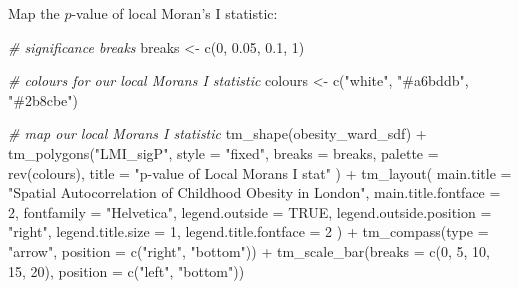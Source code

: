 \documentclass[
]{book}
\newenvironment{Shaded}{\begin{snugshade}}{\end{snugshade}}
\newcommand{\AttributeTok}[1]{\textcolor[rgb]{0.77,0.63,0.00}{#1}}
\newcommand{\CommentTok}[1]{\textcolor[rgb]{0.56,0.35,0.01}{\textit{#1}}}
\newcommand{\ConstantTok}[1]{\textcolor[rgb]{0.00,0.00,0.00}{#1}}
\newcommand{\DecValTok}[1]{\textcolor[rgb]{0.00,0.00,0.81}{#1}}
\newcommand{\FloatTok}[1]{\textcolor[rgb]{0.00,0.00,0.81}{#1}}
\newcommand{\FunctionTok}[1]{\textcolor[rgb]{0.00,0.00,0.00}{#1}}
\newcommand{\NormalTok}[1]{#1}
\newcommand{\OtherTok}[1]{\textcolor[rgb]{0.56,0.35,0.01}{#1}}
\newcommand{\SpecialCharTok}[1]{\textcolor[rgb]{0.00,0.00,0.00}{#1}}
\newcommand{\StringTok}[1]{\textcolor[rgb]{0.31,0.60,0.02}{#1}}
\begin{document}
Map the \(p\)-value of local Moran's I statistic:

\begin{Shaded}
\begin{Highlighting}[]
\CommentTok{\# significance breaks}
\NormalTok{breaks }\OtherTok{\textless{}{-}} \FunctionTok{c}\NormalTok{(}\DecValTok{0}\NormalTok{, }\FloatTok{0.05}\NormalTok{, }\FloatTok{0.1}\NormalTok{, }\DecValTok{1}\NormalTok{)}

\CommentTok{\# colours for our local Moran\textquotesingle{}s I statistic}
\NormalTok{colours }\OtherTok{\textless{}{-}} \FunctionTok{c}\NormalTok{(}\StringTok{"white"}\NormalTok{, }\StringTok{"\#a6bddb"}\NormalTok{, }\StringTok{"\#2b8cbe"}\NormalTok{)}

\CommentTok{\# map our local Moran\textquotesingle{}s I statistic}
\FunctionTok{tm\_shape}\NormalTok{(obesity\_ward\_sdf) }\SpecialCharTok{+}
  \FunctionTok{tm\_polygons}\NormalTok{(}\StringTok{"LMI\_sigP"}\NormalTok{,}
    \AttributeTok{style =} \StringTok{"fixed"}\NormalTok{, }\AttributeTok{breaks =}\NormalTok{ breaks,}
    \AttributeTok{palette =} \FunctionTok{rev}\NormalTok{(colours), }\AttributeTok{title =} \StringTok{"p{-}value of Local Moran\textquotesingle{}s I stat"}
\NormalTok{  ) }\SpecialCharTok{+}
  \FunctionTok{tm\_layout}\NormalTok{(}
    \AttributeTok{main.title =} \StringTok{"Spatial Autocorrelation of Childhood Obesity in London"}\NormalTok{,}
    \AttributeTok{main.title.fontface =} \DecValTok{2}\NormalTok{, }\AttributeTok{fontfamily =} \StringTok{"Helvetica"}\NormalTok{,}
    \AttributeTok{legend.outside =} \ConstantTok{TRUE}\NormalTok{,}
    \AttributeTok{legend.outside.position =} \StringTok{"right"}\NormalTok{,}
    \AttributeTok{legend.title.size =} \DecValTok{1}\NormalTok{,}
    \AttributeTok{legend.title.fontface =} \DecValTok{2}
\NormalTok{  ) }\SpecialCharTok{+}
  \FunctionTok{tm\_compass}\NormalTok{(}\AttributeTok{type =} \StringTok{"arrow"}\NormalTok{, }\AttributeTok{position =} \FunctionTok{c}\NormalTok{(}\StringTok{"right"}\NormalTok{, }\StringTok{"bottom"}\NormalTok{)) }\SpecialCharTok{+}
  \FunctionTok{tm\_scale\_bar}\NormalTok{(}\AttributeTok{breaks =} \FunctionTok{c}\NormalTok{(}\DecValTok{0}\NormalTok{, }\DecValTok{5}\NormalTok{, }\DecValTok{10}\NormalTok{, }\DecValTok{15}\NormalTok{, }\DecValTok{20}\NormalTok{), }\AttributeTok{position =} \FunctionTok{c}\NormalTok{(}\StringTok{"left"}\NormalTok{, }\StringTok{"bottom"}\NormalTok{))}
\end{Highlighting}
\end{Shaded}
\end{document}
